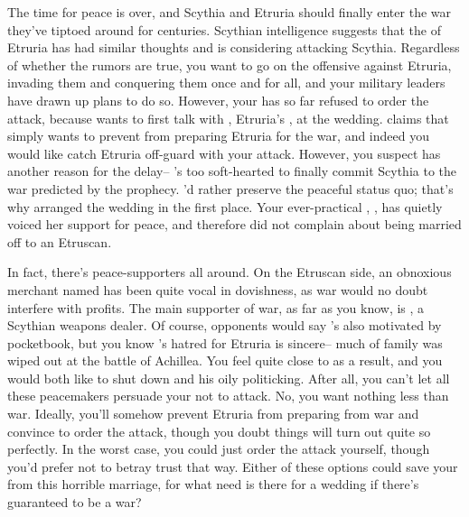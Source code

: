 \documentclass[char]{Kos}
\begin{document}
The time for peace is over, and Scythia and Etruria should finally enter the war they've tiptoed around for centuries. Scythian intelligence suggests that the \cEtruriaKing{\monarch} of Etruria has had similar thoughts and is considering attacking Scythia. Regardless of whether the rumors are true, you want to go on the offensive against Etruria, invading them and conquering them once and for all, and your military leaders have drawn up plans to do so. However, your \cScythiaKing{\spouse} has so far refused to order the attack, because \cScythiaKing{\they} wants to first talk with \cEtruriaKing{\nickname}, Etruria's \cEtruriaKing{\monarch}, at the wedding. \cScythiaKing{\They} claims that \cScythiaKing{\they} simply wants to prevent \cEtruriaKing{\nickname} from preparing Etruria for the war, and indeed you would like catch Etruria off-guard with your attack. However, you suspect \cScythiaKing{\nickname} has another reason for the delay-- \cScythiaKing{\they}'s too soft-hearted to finally commit Scythia to the war predicted by the prophecy. \cScythiaKing{\They}'d rather preserve the peaceful status quo; that's why \cScythiaKing{\they} arranged the wedding in the first place. Your ever-practical \cBride{\child}, \cBride{\nickname}, has quietly voiced her support for peace, and \cBride{\they} therefore did not complain about being married off to an Etruscan. 

In fact, there's peace-supporters all around. On the Etruscan side, an obnoxious merchant named \cMerchant{\nickname} has been quite vocal in \cMerchant{\their} dovishness, as war would no doubt interfere with \cMerchant{\their} profits. The main supporter of war, as far as you know, is \cArmsDealer{\nickname}, a Scythian weapons dealer. Of course, \cArmsDealer{\their} opponents would say \cArmsDealer{\they}'s also motivated by \cArmsDealer{\their} pocketbook, but you know \cArmsDealer{\nickname}'s hatred for Etruria is sincere-- much of \cArmsDealer{\their} family was wiped out at the battle of Achillea. You feel quite close to \cArmsDealer{\nickname} as a result, and you would both like to shut down \cMerchant{\nickname} and his oily politicking. After all, you can't let all these peacemakers persuade your \cScythiaKing{\spouse} not to attack. No, you want nothing less than war. Ideally, you'll somehow prevent Etruria from preparing from war and convince \cScythiaKing{\nickname} to order the attack,  though you doubt things will turn out quite so perfectly. In the worst case, you could just order the attack yourself, though you'd prefer not to betray \cScythiaKing{\their} trust that way. Either of these options could save your \cBride{\child} from this horrible marriage, for what need is there for a wedding if there's guaranteed to be a war? 
\end{document}
